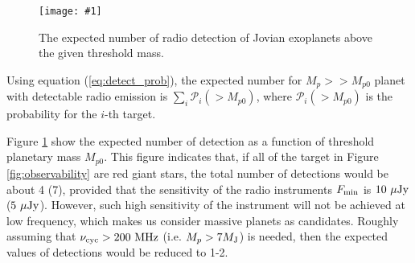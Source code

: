 \documentclass[iop,numberedappendix,apj,twocolappendix,]{emulateapj}
\def\plotoneh#1{\centering \leavevmode
\texttt{[image: \#1]}}
\begin{document}
\begin{figure}[htbp]
   \plotoneh{cumulative_expected_value.pdf}
   \caption{The expected number of radio detection of Jovian exoplanets above the given threshold mass. }
  \label{fig:expected_values}
\end{figure}

Using equation (\ref{eq:detect_prob}), the expected number for $M_p > >M_{p0}$ planet with detectable radio emission is $\sum _i \mathcal{P} _i(>M_{p0})$, where $\mathcal{P}_i(>M_{p0})$ is the probability for the $i$-th target. 

Figure \ref{fig:expected_values} show the expected number of detection as a function of threshold planetary mass $M_{p0}$. This figure indicates that, if all of the target in Figure \ref{fig:observability} are red giant stars, %
the total number of detections would be about 4 (7), provided that the sensitivity of the radio instruments $F_{\rm min}$ is $10~\mu {\rm Jy}$ ($5~\mu {\rm Jy}$). 
However, such high sensitivity of the instrument will not be achieved at low frequency, which makes us consider massive planets as candidates. 
Roughly assuming that $\nu _{\rm cyc} > 200~{\rm MHz} $ (i.e. $M_p > 7 M_{\rm J}$) is needed, then the expected values of detections would be reduced to 1-2. 






\color{black}
\end{document}
